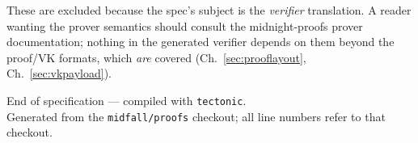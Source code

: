 These are excluded because the spec's subject is the \emph{verifier}
translation. A reader wanting the prover semantics should consult the
midnight-proofs prover documentation; nothing in the generated verifier
depends on them beyond the proof/VK formats, which \emph{are} covered
(Ch.~\ref{sec:prooflayout}, Ch.~\ref{sec:vkpayload}).

\vfill
\begin{center}
\small\textcolor{black!60}{
End of specification --- compiled with \texttt{tectonic}.\\
Generated from the \texttt{midfall/proofs} checkout; all line numbers
refer to that checkout.}
\end{center}
